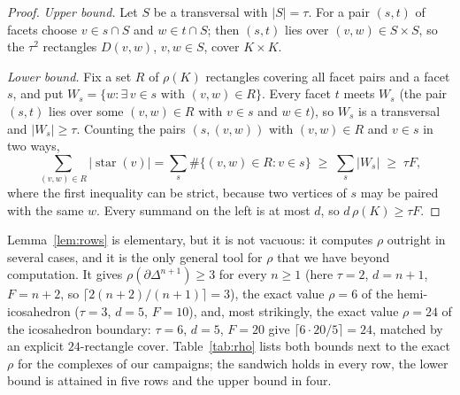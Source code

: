 \documentclass[12pt]{article}
\begin{document}
\begin{proof}
\emph{Upper bound.}  Let $S$ be a transversal with $|S|=\tau$.  For a
pair $(s,t)$ of facets choose $v\in s\cap S$ and $w\in t\cap S$; then
$(s,t)$ lies over $(v,w)\in S\times S$, so the $\tau^2$ rectangles
$D(v,w)$, $v,w\in S$, cover $K\times K$.

\emph{Lower bound.}  Fix a set $R$ of $\rho(K)$ rectangles covering all
facet pairs and a facet $s$, and put
$W_s=\{w:\exists\,v\in s\text{ with }(v,w)\in R\}$.  Every facet $t$ meets
$W_s$ (the pair $(s,t)$ lies over some $(v,w)\in R$ with $v\in s$ and
$w\in t$), so $W_s$ is a transversal and $|W_s|\ge\tau$.  Counting the
pairs $(s,(v,w))$ with $(v,w)\in R$ and $v\in s$ in two ways,
\[
\sum_{(v,w)\in R}|\operatorname{star}(v)|
=\sum_s\#\{(v,w)\in R:v\in s\}
\;\ge\;\sum_s|W_s|\;\ge\;\tau F ,
\]
where the first inequality can be strict, because two vertices of $s$
may be paired with the same $w$.  Every summand on the left is at
most $d$, so $d\,\rho(K)\ge\tau F$.
\end{proof}

Lemma~\ref{lem:rows} is elementary, but it is not vacuous: it computes
$\rho$ outright in several cases, and it is the only general
tool for $\rho$ that we have beyond computation.  It gives $\rho(\partial\Delta^{n+1})\ge3$
for every $n\ge1$ (here $\tau=2$, $d=n+1$, $F=n+2$, so
$\lceil2(n+2)/(n+1)\rceil=3$), the exact value $\rho=6$ of the
hemi-icosahedron ($\tau=3$, $d=5$, $F=10$), and, most strikingly, the
exact value $\rho=24$ of the icosahedron boundary: $\tau=6$, $d=5$,
$F=20$ give $\lceil 6\cdot20/5\rceil=24$, matched by an explicit
$24$-rectangle cover.  Table~\ref{tab:rho} lists both bounds next to the
exact $\rho$ for the complexes of our campaigns; the sandwich holds in every row, the
lower bound is attained in five rows and the upper bound in four.
\end{document}
